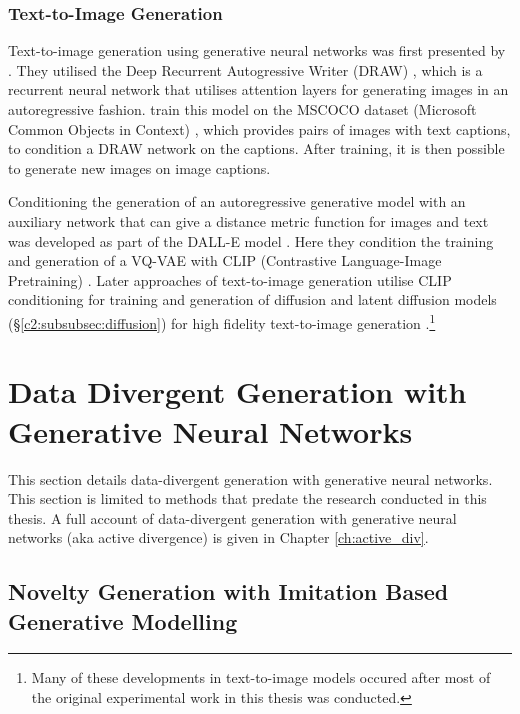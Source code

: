 \subsubsection{Text-to-Image Generation}

Text-to-image generation using generative neural networks was first presented by \cite{mansimov2015generating}.
They utilised the Deep Recurrent Autogressive Writer (DRAW) \citep{gregor2015draw}, which is a recurrent neural network that utilises attention layers for generating images in an autoregressive fashion.
\cite{mansimov2015generating} train this model on the MSCOCO dataset (Microsoft Common Objects in Context) \citep{lin2014microsoft}, which provides pairs of images with text captions, to condition a DRAW network on the captions.
After training, it is then possible to generate new images on image captions.

Conditioning the generation of an autoregressive generative model with an auxiliary network that can give a distance metric function for images and text was developed as part of the DALL-E model \citep{ramesh2021zero}.
Here they condition the training and generation of a VQ-VAE \citep{razavi2019generating} with CLIP (Contrastive Language-Image Pretraining) \citep{radford2021learning}.
Later approaches of text-to-image generation utilise CLIP conditioning for training and generation of diffusion and latent diffusion models (\S \ref{c2:subsubsec:diffusion}) for high fidelity text-to-image generation \citep{rombach2022high}.\footnote{Many of these developments in text-to-image models occured after most of the original experimental work in this thesis was conducted.}


\section{Data Divergent Generation with Generative Neural Networks}
\label{c2:sec:data-divergent}

This section details data-divergent generation with generative neural networks. 
This section is limited to methods that predate the research conducted in this thesis.
A full account of data-divergent generation with generative neural networks (aka active divergence) is given in Chapter \ref{ch:active_div}.

\subsection{Novelty Generation with Imitation Based Generative Modelling}

